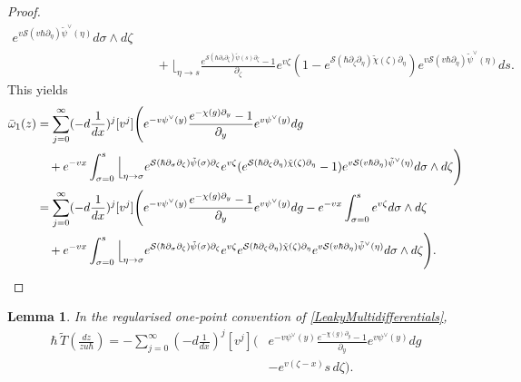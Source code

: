 \documentclass[10pt,a4paper,oneside,no-math,reqno]{amsart}%
\theoremstyle{plain}
\newtheorem{lemma}[theorem]{Lemma}
\theoremstyle{definition}
\theoremstyle{remark}
\numberwithin{equation}{section}
\newcommand{\mc}[1]{\mathcal{#1}}
\newcommand{\1}{\mathds{1}}
\newcommand{\<}{\langle}
\renewcommand{\>}{\rangle}
\newcommand{\del}{\partial}
\begin{document}
\begin{proof}
\begin{equation*}
\begin{split}
			e^{v \mc{S}(v\hbar \del_{\eta}) \tilde{\psi}^\vee(\eta) } d\sigma \wedge d\zeta
			\\
			&\quad
			+
			\Big\lfloor_{\eta \to s} \frac{e^{ \mc{S}(\hbar \del_s \del_\zeta) \tilde{\psi}(s) \del_\zeta} - 1}{\del_\zeta} e^{v\zeta} (1 - e^{ \mc{S}(\hbar \del_\zeta \del_\eta) \tilde{\chi}(\zeta) \del_\eta } )
			e^{v \mc{S}(v\hbar \del_{\eta}) \tilde{\psi}^\vee(\eta) } ds .
		\end{split}
	\end{equation*}
	This yields
	\begin{align*}
			\bar{\omega}_1 (z)
      &=
      \sum_{j=0}^\infty (-d \frac{1}{dx})^j [v^j ] 
			\Bigg( 
      e^{-v \psi^\vee (y)}  \frac{e^{-\chi (g) \del_y} - 1}{\del_y} e^{v \psi^\vee (y )} dg 
      \\
      &\quad
      + 
      e^{-vx}
      \int_{\sigma = 0}^s \Big\lfloor_{\eta \to \sigma} e^{ \mc{S}(\hbar \del_\sigma \del_\zeta) \tilde{\psi}(\sigma) \del_\zeta} e^{v\zeta} (e^{ \mc{S}(\hbar \del_\zeta \del_\eta) \tilde{\chi}(\zeta) \del_\eta } -1  )
			e^{v \mc{S}(v\hbar \del_{\eta}) \tilde{\psi}^\vee(\eta) } d\sigma \wedge d\zeta
      \Bigg) 
      \\
      &=
      \sum_{j=0}^\infty (-d \frac{1}{dx})^j [v^j ] 
			\Bigg( 
      e^{-v \psi^\vee (y)}  \frac{e^{-\chi (g) \del_y} - 1}{\del_y} e^{v \psi^\vee (y )} dg
      - 
      e^{-vx}
      \int_{\sigma = 0}^s e^{v\zeta} d\sigma \wedge d\zeta
      \\
      &\quad
      + 
      e^{-vx}
      \int_{\sigma = 0}^s \Big\lfloor_{\eta \to \sigma} e^{ \mc{S}(\hbar \del_\sigma \del_\zeta) \tilde{\psi}(\sigma) \del_\zeta} e^{v\zeta} e^{ \mc{S}(\hbar \del_\zeta \del_\eta) \tilde{\chi}(\zeta) \del_\eta } 
			e^{v \mc{S}(v\hbar \del_{\eta}) \tilde{\psi}^\vee(\eta) } d\sigma \wedge d\zeta
      \Bigg) . \qedhere
	\end{align*}
\end{proof}

\begin{lemma}\label{PolarCancellation}
	In the regularised one-point convention of \cref{LeakyMultidifferentials},
	\begin{equation}
		\begin{split}
			\hbar\,\tilde{T}\left(\frac{dz}{zu\hbar}\right)
			=
			-\sum_{j=0}^\infty (-d \frac{1}{dx})^j [v^j]
			\Bigg(
			&e^{-v \psi^\vee (y)} \frac{e^{-\chi (g) \del_y} - 1}{\del_y} e^{v \psi^\vee(y)} dg
			\\
			&-
			e^{v(\zeta-x)}s\,d\zeta
			\Bigg).
		\end{split}
	\end{equation}
\end{lemma}
\end{document}
